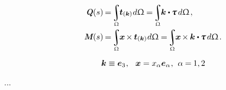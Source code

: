 \begin{otherlanguage}{russian}
\nopagebreak\vspace{.1em}\begin{align}
\internalforce(s) \hspace{-0.2ex}
&= \hspace{-0.3ex} \scalebox{.88}{$ \displaystyle\integral_{\rodsection} $} \hspace{-0.25ex} \tractionvector{\tangenttoaxis} \hspace{.3ex} d\rodsection \hspace{-0.1ex}
= \hspace{-0.3ex} \scalebox{.88}{$ \displaystyle\integral_{\rodsection} $} \hspace{-0.25ex} \tangenttoaxis \dotp \hspace{-0.1ex} \cauchystress \hspace{.3ex} d\rodsection\hspace{.2ex} ,
\\
\internalmoment(s) \hspace{-0.2ex}
&= \hspace{-0.3ex} \scalebox{.88}{$ \displaystyle\integral_{\rodsection} $} \hspace{-0.25ex} \bm{x} \hspace{-0.2ex} \times \hspace{-0.1ex} \tractionvector{\tangenttoaxis} \hspace{.3ex} d\rodsection \hspace{-0.1ex}
= \hspace{-0.3ex} \scalebox{.88}{$ \displaystyle\integral_{\rodsection} $} \hspace{-0.25ex} \bm{x} \hspace{-0.2ex} \times \hspace{-0.1ex} \tangenttoaxis \dotp \hspace{-0.1ex} \cauchystress \hspace{.3ex} d\rodsection
\hspace{.2ex} .
\end{align}

\[
\bm{k} \equiv \bm{e}_3
\hspace{.1ex} , \hspace{.7em}
\bm{x} = x_{\alpha} \bm{e}_\alpha
\hspace{.1ex} , \hspace{.4em}
\alpha \hspace{-0.1ex} = \hspace{-0.12ex} 1, 2
\]

...


\end{otherlanguage}
